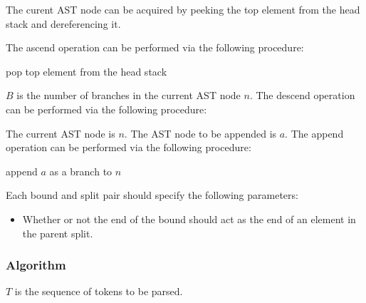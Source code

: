 \documentclass[10pt,a4paper]{article}
\begin{document}
The curent AST node can be acquired by peeking the top element from the head stack and dereferencing it.

The ascend operation can be performed via the following procedure:\newline
\begin{algorithm}[H]
\caption{$ascend(builder)$}

pop top element from the head stack\;
\end{algorithm}

$B$ is the number of branches in the current AST node $n$. The descend operation can be performed via the following procedure:\newline
\begin{algorithm}[H]
\caption{$descend(builder)$}

\end{algorithm}

The current AST node is $n$. The AST node to be appended is $a$. The append operation can be performed via the following procedure:\newline
\begin{algorithm}[H]
\caption{$append(builder)$}

append $a$ as a branch to $n$\;
\end{algorithm}

Each bound and split pair should specify the following parameters:
\begin{itemize}
\item Whether or not the end of the bound should act as the end of an element in the parent split.
\end{itemize}

\newpage
\subsubsection{Algorithm}
$T$ is the sequence of tokens to be parsed.\newline
\end{document}
